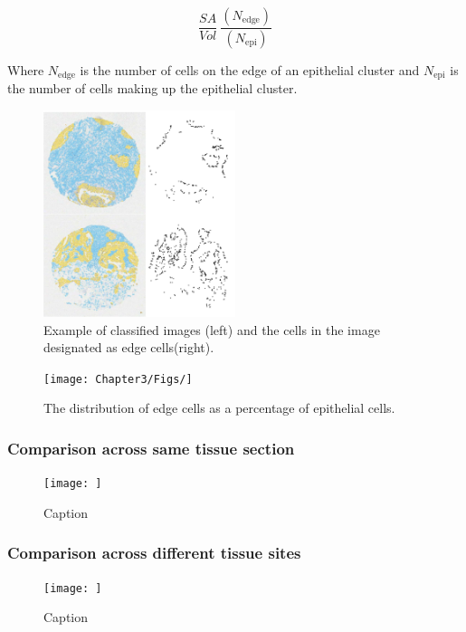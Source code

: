 \[\frac{SA}{Vol} ~ \frac{(N_{\mathrm{edge}})} {(N_{\mathrm{epi}})}\]

Where $N_{\mathrm{edge}}$ is the number of cells on the edge of an epithelial cluster and $N_{\mathrm{epi}}$ is the number of cells making up the epithelial cluster.

\begin{figure}
    \centering
    \includegraphics[width=0.5\textwidth]{Chapter3/Figs/Thesis-08.png}
    \caption{Example of classified images (left) and the cells in the image designated as edge cells(right).}
    \label{fig:edge_cells}
\end{figure}

\begin{figure}
    \centering
    \texttt{[image: Chapter3/Figs/]}
    \caption{The distribution of edge cells as a percentage of epithelial cells.}
    \label{fig:edge_cells}
\end{figure}


\subsubsection{Comparison across same tissue section}
\begin{figure}
    \centering
    \texttt{[image: ]}
    \caption{Caption}
    \label{fig:my_label}
\end{figure}
\subsubsection{Comparison across different tissue sites}
\begin{figure}
    \centering
    \texttt{[image: ]}
    \caption{Caption}
    \label{fig:my_label}
\end{figure}


